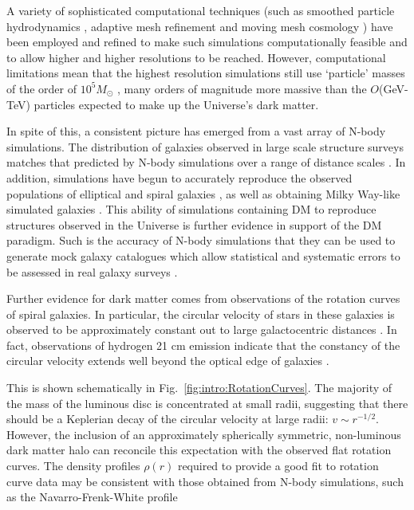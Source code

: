 A variety of sophisticated computational techniques (such as smoothed particle hydrodynamics \cite{Stinson:2010}, adaptive mesh refinement \cite{Norman:1999} and moving mesh cosmology \cite{Springel:2010}) have been employed and refined to make such simulations computationally feasible and to allow higher and higher resolutions to be reached. However, computational limitations mean that the highest resolution simulations still use `particle' masses of the order of $10^5 M_{\odot}$ \cite{Pillepich:2014}, many orders of magnitude more massive than the $O$(GeV-TeV) particles expected to make up the Universe's dark matter.

In spite of this, a consistent picture has emerged from a vast array of N-body simulations. The distribution of galaxies observed in large scale structure surveys matches that predicted by N-body simulations over a range of distance scales \cite{Springel:2005}. In addition, simulations have begun to accurately reproduce the observed populations of elliptical and spiral galaxies \cite{Vogelsberger:2014}, as well as obtaining Milky Way-like simulated galaxies \cite{Mollitor:2014}. This ability of simulations containing DM to reproduce structures observed in the Universe is further evidence in support of the DM paradigm. Such is the accuracy of N-body simulations that they can be used to generate mock galaxy catalogues which allow statistical and systematic errors to be assessed in real galaxy surveys \cite{Lemson:2006}.



Further evidence for dark matter comes from observations of the rotation curves of spiral galaxies. In particular, the circular velocity of stars in these galaxies is observed to be approximately constant out to large galactocentric distances \cite{Begeman:1991,Persic:1996}. In fact, observations of hydrogen 21 cm emission indicate that the constancy of the circular velocity extends well beyond the optical edge of galaxies \cite{Bosma:1981a, Bosma:1981b}.

This is shown schematically in Fig.~\ref{fig:intro:RotationCurves}. The majority of the mass of the luminous disc is concentrated at small radii, suggesting that there should be a Keplerian decay of the circular velocity at large radii: $v \sim r^{-1/2}$. However, the inclusion of an approximately spherically symmetric, non-luminous dark matter halo can reconcile this expectation with the observed flat rotation curves. The density profiles $\rho(r)$ required to provide a good fit to rotation curve data may be consistent with those obtained from N-body simulations, such as the Navarro-Frenk-White profile \cite{Navarro:1996}

